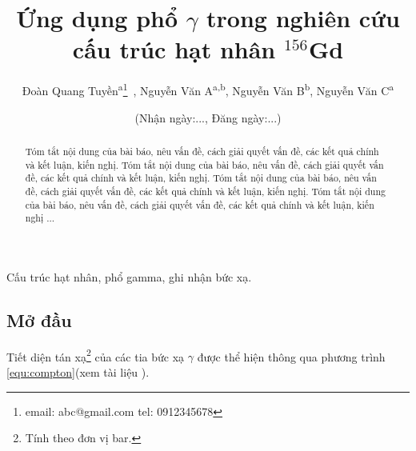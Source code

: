 \documentclass[11pt, a4paper, bold, center, twoside, journal]{paper}
\def\submit{\small (Nhận ngày:..., Đăng ngày:...)}%
\begin{document}
\title{Ứng dụng phổ $\gamma$ trong nghiên cứu cấu trúc hạt nhân $^{156}$Gd}

\author{Đoàn Quang Tuyền\textsuperscript{a}\thanks{email: abc@gmail.com \newline tel: 0912345678}~, Nguyễn Văn A\textsuperscript{a,b}, 
	Nguyễn Văn B\textsuperscript{b}, 
	Nguyễn Văn C\textsuperscript{a}
}

\date{\submit}

\maketitle

\begin{abstract}
Tóm tắt nội dung của bài báo, nêu vấn đề, cách giải quyết vấn đề, các kết quả chính và kết luận, kiến nghị. Tóm tắt nội dung của bài báo, nêu vấn đề, cách giải quyết vấn đề, các kết quả chính và kết luận, kiến nghị. Tóm tắt nội dung của bài báo, nêu vấn đề, cách giải quyết vấn đề, các kết quả chính và kết luận, kiến nghị. Tóm tắt nội dung của bài báo, nêu vấn đề, cách giải quyết vấn đề, các kết quả chính và kết luận, kiến nghị ...
\end{abstract}

\begin{keywords}
Cấu trúc hạt nhân, phổ gamma, ghi nhận bức xạ.
\end{keywords}

\begin{multicols}{2}%

\section{Mở đầu}

Tiết diện tán xạ\footnote{Tính theo đơn vị bar.} của các tia bức xạ $\gamma$ được thể hiện thông qua phương trình \ref{equ:compton}(xem tài liệu \cite{bib_Klein, bib_Knoll}).  




\end{multicols}%
\end{document}
